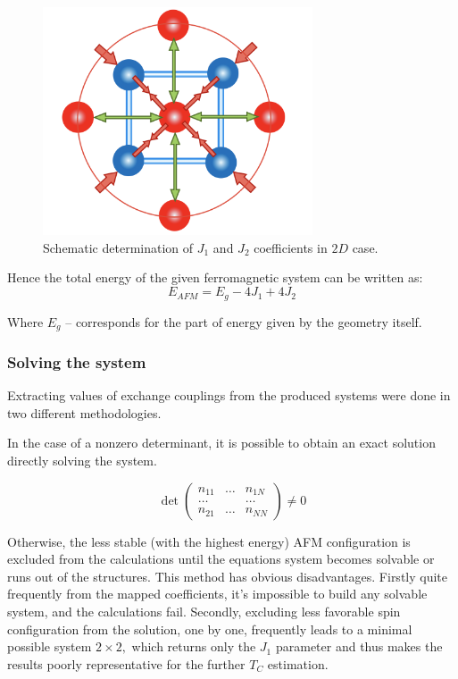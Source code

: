 \begin{figure}[H]
\centering
\captionsetup{justification=centering,margin=2cm}
\includegraphics[width=80mm]{fig/dft_fig/spinupdown.png}
\caption{Schematic determination of $J_1$ and $J_2$ coefficients in $2D$ case.}
\label{fig:spinupdown}
\end{figure} 


Hence the total energy of the given ferromagnetic system can be written as:
\begin{equation}
E_{AFM}=E_{g}-4J_1+4J_2
\end{equation}

Where $E_g$ – corresponds for the part of energy given by the geometry itself.


\subsubsection{Solving the system}

Extracting values of exchange couplings from the produced systems were done in two different methodologies.

In the case of a nonzero determinant, it is possible to obtain an exact solution directly solving the system. 

\begin{equation}
\det\begin{pmatrix} 
n_{11} & \hdots & n_{1N} \\ 
\hdots &  & \hdots\\
n_{21} & \hdots &  n_{NN} 
\end{pmatrix} \neq 0
\end{equation}


Otherwise, the less stable (with the highest energy) AFM configuration is excluded from the calculations until the equations system becomes solvable or runs out of the structures. This method has obvious disadvantages. Firstly quite frequently from the mapped coefficients, it's impossible to build any solvable system, and the calculations fail. Secondly, excluding less favorable spin configuration from the solution, one by one, frequently leads to a minimal possible system $2\times2,$ which returns only the $J_1$ parameter and thus makes the results poorly representative for the further $T_C$ estimation.

